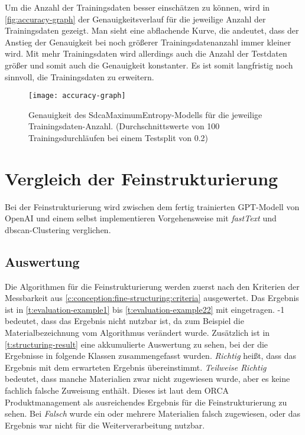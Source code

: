 Um die Anzahl der Trainingsdaten besser einschätzen zu können, wird in \autoref{fig:accuracy-graph} der Genauigkeitsverlauf für die jeweilige Anzahl der Trainingsdaten gezeigt. Man sieht eine abflachende Kurve, die andeutet, dass der Anstieg der Genauigkeit bei noch größerer Trainingsdatenanzahl immer kleiner wird. Mit mehr Trainingsdaten wird allerdings auch die Anzahl der Testdaten größer und somit auch die Genauigkeit konstanter. Es ist somit langfristig noch sinnvoll, die Trainingsdaten zu erweitern.

\begin{figure}[h]
	\centering
	\texttt{[image: accuracy-graph]}
	\caption[Genauigkeit des SdcaMaximumEntropy-Modells]{Genauigkeit des SdcaMaximumEntropy-Modells für die jeweilige Trainingsdaten-Anzahl. (Durchschnittswerte von 100 Trainingsdurchläufen bei einem Testsplit von 0.2)}
	\label{fig:accuracy-graph}
\end{figure}

\section{Vergleich der Feinstrukturierung}
\label{c:comparison:fine-structuring}
Bei der Feinstrukturierung wird zwischen dem fertig trainierten GPT-Modell von OpenAI und einem selbst implementieren Vorgehensweise mit \textit{fastText} und \ac{dbscan}-Clustering verglichen.
\subsection{Auswertung}
\label{c:comparison:fine-structuring:evaluation}
Die Algorithmen für die Feinstrukturierung werden zuerst nach den Kriterien der Messbarkeit aus \autoref{c:conception:fine-structuring:criteria} ausgewertet.
Das Ergebnis ist in \autoref{t:evaluation-example1} bis \autoref{t:evaluation-example22} mit eingetragen. -1 bedeutet, dass das Ergebnis nicht nutzbar ist, da zum Beispiel die Materialbezeichnung vom Algorithmus verändert wurde. Zusätzlich ist in \autoref{t:structuring-result} eine akkumulierte Auswertung zu sehen, bei der die Ergebnisse in folgende Klassen zusammengefasst wurden. \textit{Richtig} heißt, dass das Ergebnis mit dem erwarteten Ergebnis übereinstimmt. \textit{Teilweise Richtig} bedeutet, dass manche Materialien zwar nicht zugewiesen wurde, aber es keine fachlich falsche Zuweisung enthält. Dieses ist laut dem ORCA Produktmanagement als ausreichendes Ergebnis für die Feinstrukturierung zu sehen.  Bei \textit{Falsch} wurde ein oder mehrere Materialien falsch zugewiesen, oder das Ergebnis war nicht für die Weiterverarbeitung nutzbar. 

